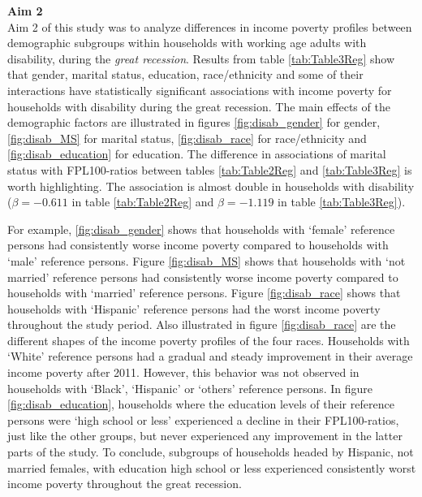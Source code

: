 \documentclass[11pt]{extarticle} %
\begin{document}
\noindent
{\bf{Aim 2}}\\
Aim 2 of this study was to analyze differences in income poverty profiles between demographic subgroups within households with working age adults with disability, during the {\emph{great recession}}. Results from table \ref{tab:Table3Reg} show that gender, marital status, education, race/ethnicity and some of their interactions have statistically significant associations with income poverty for households with disability during the great recession. The main effects of the demographic factors are illustrated in figures \ref{fig:disab_gender} for gender, \ref{fig:disab_MS} for marital status, \ref{fig:disab_race} for race/ethnicity and \ref{fig:disab_education} for education. The difference in associations of marital status with FPL100-ratios between tables \ref{tab:Table2Reg} and \ref{tab:Table3Reg} is worth highlighting. The association is almost double in households with disability ($\beta = -0.611$ in table \ref{tab:Table2Reg} and $\beta=-1.119$ in table \ref{tab:Table3Reg}). 

For example, \ref{fig:disab_gender} shows that households with `female' reference persons had consistently worse income poverty compared to households with `male' reference persons. Figure \ref{fig:disab_MS} shows that households with `not married' reference persons had consistently worse income poverty compared to households with `married' reference persons. Figure \ref{fig:disab_race} shows that households with `Hispanic' reference persons had the worst income poverty throughout the study period. Also illustrated in figure \ref{fig:disab_race} are the different shapes of the income poverty profiles of the four races. Households with `White' reference persons had a gradual and steady improvement in their average income poverty after 2011. However, this behavior was not observed in households with `Black', `Hispanic' or `others' reference persons. In figure \ref{fig:disab_education}, households where the education levels of their reference persons were `high school or less' experienced a decline in their FPL100-ratios, just like the other groups, but never experienced any improvement in the latter parts of the study. To conclude, subgroups of households headed by Hispanic, not married females, with education high school or less experienced consistently worst income poverty throughout the great recession. 

\end{document}
